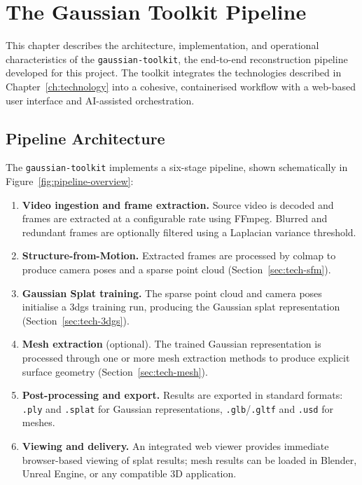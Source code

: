 \chapter{The Gaussian Toolkit Pipeline}
\label{ch:pipeline}

This chapter describes the architecture, implementation, and operational characteristics of the \texttt{gaussian-toolkit}, the end-to-end reconstruction pipeline developed for this project. The toolkit integrates the technologies described in Chapter~\ref{ch:technology} into a cohesive, containerised workflow with a web-based user interface and AI-assisted orchestration.

\section{Pipeline Architecture}
\label{sec:pipe-arch}

The \texttt{gaussian-toolkit} implements a six-stage pipeline, shown schematically in Figure~\ref{fig:pipeline-overview}:

\begin{enumerate}
  \item \textbf{Video ingestion and frame extraction.} Source video is decoded and frames are extracted at a configurable rate using FFmpeg. Blurred and redundant frames are optionally filtered using a Laplacian variance threshold.

  \item \textbf{Structure-from-Motion.} Extracted frames are processed by \acrshort{colmap} to produce camera poses and a sparse point cloud (Section~\ref{sec:tech-sfm}).

  \item \textbf{Gaussian Splat training.} The sparse point cloud and camera poses initialise a \acrshort{3dgs} training run, producing the Gaussian splat representation (Section~\ref{sec:tech-3dgs}).

  \item \textbf{Mesh extraction} (optional). The trained Gaussian representation is processed through one or more mesh extraction methods to produce explicit surface geometry (Section~\ref{sec:tech-mesh}).

  \item \textbf{Post-processing and export.} Results are exported in standard formats: \texttt{.ply} and \texttt{.splat} for Gaussian representations, \texttt{.glb}/\texttt{.gltf} and \texttt{.usd} for meshes.

  \item \textbf{Viewing and delivery.} An integrated web viewer provides immediate browser-based viewing of splat results; mesh results can be loaded in Blender, Unreal Engine, or any compatible 3D application.
\end{enumerate}

